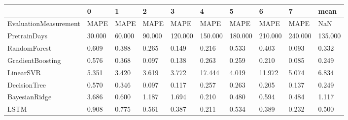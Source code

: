 \begin{tabular}{llllllllll}
\toprule
{} &      0 &      1 &      2 &       3 &       4 &       5 &       6 &       7 &    mean \\
\midrule
EvaluationMeasurement &   MAPE &   MAPE &   MAPE &    MAPE &    MAPE &    MAPE &    MAPE &    MAPE &     NaN \\
PretrainDays          & 30.000 & 60.000 & 90.000 & 120.000 & 150.000 & 180.000 & 210.000 & 240.000 & 135.000 \\
RandomForest          &  0.609 &  0.388 &  0.265 &   0.149 &   0.216 &   0.533 &   0.403 &   0.093 &   0.332 \\
GradientBoosting      &  0.576 &  0.368 &  0.097 &   0.138 &   0.263 &   0.259 &   0.210 &   0.085 &   0.249 \\
LinearSVR             &  5.351 &  3.420 &  3.619 &   3.772 &  17.444 &   4.019 &  11.972 &   5.074 &   6.834 \\
DecisionTree          &  0.570 &  0.346 &  0.097 &   0.117 &   0.257 &   0.263 &   0.205 &   0.137 &   0.249 \\
BayesianRidge         &  3.686 &  0.600 &  1.187 &   1.694 &   0.210 &   0.480 &   0.594 &   0.484 &   1.117 \\
LSTM                  &  0.908 &  0.775 &  0.561 &   0.387 &   0.211 &   0.534 &   0.389 &   0.232 &   0.500 \\
\bottomrule
\end{tabular}
